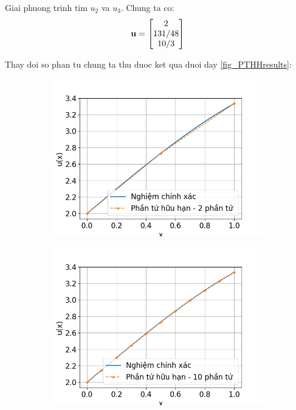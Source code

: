 Giai phuong trinh tim $u_2$ va $u_3$. Chung ta co:
\begin{equation}
    {\bf u} = \begin{bmatrix}
        2 \\ 131/48 \\ 10/3
    \end{bmatrix}
\end{equation}

Thay doi so phan tu chung ta thu duoc ket qua duoi day \cref{fig_PTHHresults}:

\begin{figure}[htbp]
    \centering
    \begin{subfigure}[b]{0.3\linewidth}
        \centering
        \includegraphics[width=\linewidth]{Tuan6/figure/PTHH_2el.png}
        \caption{}
        \label{fig:PTHH_2el}
    \end{subfigure}\hfill
    \begin{subfigure}[b]{0.3\linewidth}
        \centering
        \includegraphics[width=\linewidth]{Tuan6/figure/PTHH_10el.png}

\end{subfigure}
\end{figure}
